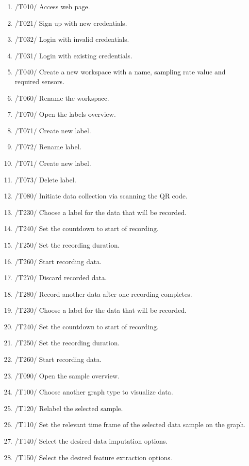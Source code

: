 \begin{enumerate}
    \item /T010/ Access web page. 
    \item /T021/ Sign up with new credentials.
    \item /T032/ Login with invalid credentials.
    \item /T031/ Login with existing credentials.
    \item /T040/ Create a new \gls{workspace} with a name, sampling rate value and required \glspl{sensor}.
    \item /T060/ Rename the \gls{workspace}.
    \item /T070/ Open the labels overview.
    \item /T071/ Create new label.
    \item /T072/ Rename label.
    \item /T071/ Create new label.
    \item /T073/ Delete label.
    \item /T080/ Initiate data collection via scanning the \gls{QR code}.
    \item /T230/ Choose a \gls{label} for the data that will be recorded.
    \item /T240/ Set the countdown to start of recording.
    \item /T250/ Set the recording duration.
    \item /T260/ Start recording data.
    \item /T270/ Discard recorded data.
    \item /T280/ Record another data after one recording completes.
    \item /T230/ Choose a \gls{label} for the data that will be recorded.
    \item /T240/ Set the countdown to start of recording.
    \item /T250/ Set the recording duration.
    \item /T260/ Start recording data.
    \item /T090/ Open the sample overview.
    \item /T100/ Choose another graph type to visualize data.
    \item /T120/ Relabel the selected sample.
    \item /T110/ Set the relevant time frame of the selected \gls{data sample} on the graph.
    \item /T140/ Select the desired data imputation options.
    \item /T150/ Select the desired \gls{feature extraction} options.

\end{enumerate}
